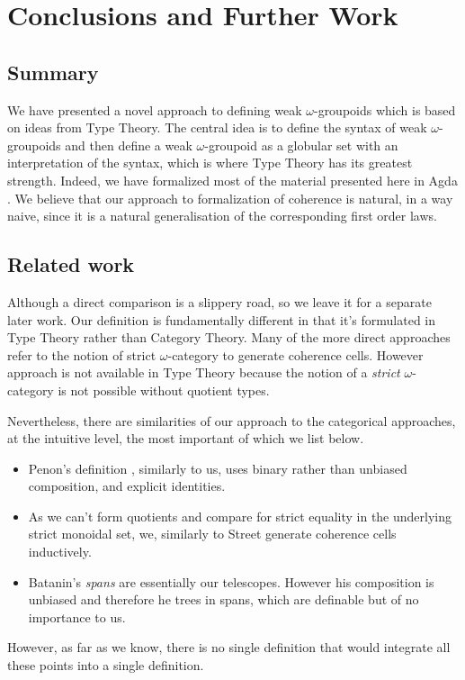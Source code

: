 \section{Conclusions and Further Work}
\label{sec:conclusions}

\subsection{Summary}
We have presented a novel approach to defining weak $\omega$-groupoids
which is based on ideas from Type Theory. The central idea is to
define the syntax of weak $\omega$-groupoids and then define a weak
$\omega$-groupoid as a globular set with an interpretation of the
syntax, which is where Type Theory has its greatest strength. Indeed,
we have formalized most of the material presented here in Agda
\cite{agda}.  We believe that our approach to formalization of
coherence is natural, in a way naive, since it is a natural
generalisation of the corresponding first order laws.

\subsection{Related work}
Although a direct comparison is a slippery road, so we leave it for a
separate later work. Our definition is fundamentally different in that
it's formulated in Type Theory rather than Category
Theory. Many of the more direct approaches
\cite{penon:1999,batanin98:monoidal-globular,leinster:2000} refer to
the notion of strict $\omega$-category to generate coherence
cells. However approach is not available in Type Theory because the
notion of a \emph{strict} $\omega$-category is not possible without
quotient types. 

Nevertheless, there are  
similarities of our approach to the categorical approaches, at the
intuitive level, the most important of which we list below.
\begin{itemize}
\item Penon's definition \cite{penon:1999}, similarly to us, uses
  binary rather than unbiased composition, and explicit
  identities. 
\item As we can't form quotients and compare for strict equality in
  the underlying strict monoidal set, we, similarly to Street
  \cite{street87:simplexes} generate coherence cells
  inductively. 

\item Batanin's \emph{spans} are essentially our telescopes. However
  his composition is unbiased and therefore he trees in spans, which
  are definable but of no importance to us. 
\end{itemize}
%
However, as far as we know, there is no single definition that would
integrate all these points into a single definition. 



